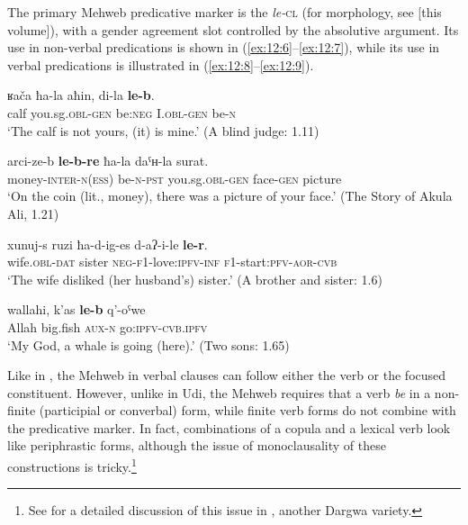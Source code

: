 ﻿\documentclass[output=paper]{langsci/langscibook}
\begin{document}
The primary Mehweb predicative marker is the  \emph{le-}\textsc{cl} (for
morphology, see \citealt{daniel2019} [this volume]), with a gender agreement slot 
controlled by the absolutive argument. Its use in non-verbal
predications is shown in (\ref{ex:12:6}–\ref{ex:12:7}), while its use in verbal predications
is illustrated in (\ref{ex:12:8}–\ref{ex:12:9}).

\ea \label{ex:12:6} %
\gll ʁača ħa-la aħin, di-la \textbf{le-b}.\\
calf you.sg.\textsc{obl}-\textsc{gen} {be}:\textsc{neg} I.\textsc{obl}-\textsc{gen} {be}-\textsc{n}\\
\glt `The calf is not yours, (it) is mine.' (A blind judge: 1.11)

\ex \label{ex:12:7} %
\gll arci-ze-b \textbf{le-b-re} ħa-la daˤʜ-la surat.\\
money-\textsc{inter}-\textsc{n}(\textsc{ess}) {be}-\textsc{n}-\textsc{pst} you.sg.\textsc{obl}-\textsc{gen} face-\textsc{gen} picture\\
\glt `On the coin (lit., money), there was a picture of your face.' (The
Story of Akula Ali, 1.21)

\ex \label{ex:12:8} %
\gll xunuj-s ruzi ħa-d-ig-es d-aʔ-i-le \textbf{le-r}.\\
wife.\textsc{obl}-\textsc{dat} sister \textsc{neg}-\textsc{f1}-love:\textsc{ipfv}-\textsc{inf} \textsc{f1}-start:\textsc{pfv}-\textsc{aor}-\textsc{cvb} \\
\glt `The wife disliked (her husband's) sister.' (A brother and sister: 1.6)

\ex \label{ex:12:9} %
\gll wallahi, k'as \textbf{le-b} q'-oˤwe\\
Allah big.fish \textsc{aux}-\textsc{n} go:\textsc{ipfv}-\textsc{cvb.ipfv}\\
\glt `My God, a whale is going (here).' (Two sons: 1.65)
\z


Like in , the Mehweb  in verbal clauses can follow
either the verb or the focused constituent. However, unlike in Udi, the
Mehweb  requires that a verb \emph{be} in a non-finite
(participial or converbal) form, while finite verb forms do not combine
with the predicative marker. In fact, combinations of a copula and a
lexical verb look like periphrastic forms, although the issue of
monoclausality of these constructions is tricky.\footnote{See \citet{sumbatova-lander2014}
  for a detailed discussion of this issue in , another Dargwa variety.}
\end{document}
